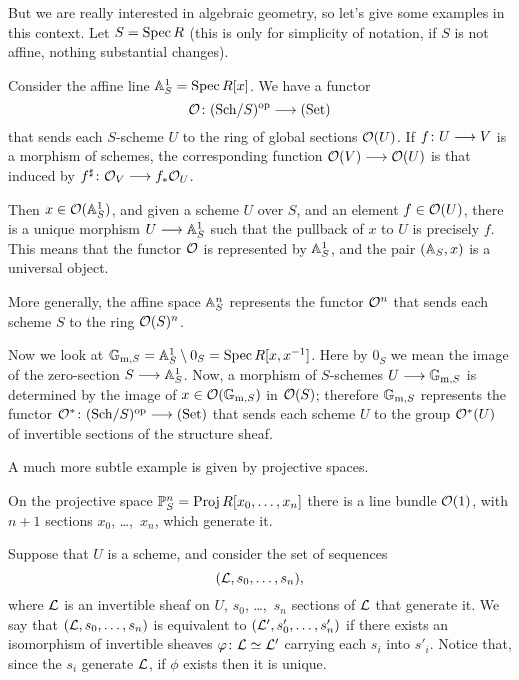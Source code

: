 \begin{2   CONTRAVARIANT FUNCTORS}
\begin{2.1 Yoneda Lemma}
\begin{enumeratei}
\end{enumeratei}

But we are really interested in algebraic geometry, so let's give some examples in this context. Let $S = \spec R$ (this is only for simplicity of notation, if $S$ is not affine, nothing substantial changes).

\begin{example}\label{ex:affinespace} Consider the affine line $\AA^1_S = \spec R[x]$. We have a functor
   \[
   \cO\colon \catsch{S}\op \arr \catset
   \]
that sends each $S$-scheme $U$ to the ring of global sections $\cO(U)$. If $f\colon U \arr V$ is a morphism of schemes, the corresponding function $\cO(V) \arr \cO(U)$ is that induced by $f^{\sharp}\colon \cO_{V} \arr f_{*}\cO_{U}$.

Then $x \in \cO(\AA^1_S)$, and given a scheme $U$ over $S$, and an element $f \in \cO(U)$, there is a unique morphism $U \arr \AA^1_S$ such that the pullback of $x$ to $U$ is precisely $f$. This means that the functor $\cO$ is represented by $\AA^1_S$, and the pair $(\AA_S, x)$ is a universal object.

More generally, the affine space $\AA^n_S$ represents the functor $\cO^n$ that sends each scheme $S$ to the ring $\cO(S)^n$.
\end{example}

\begin{example}
Now we look at $\gm = \AA^1_S \setminus 0_{S} = \spec R[x, x^{-1}]$. Here by $0_S$ we mean the image of the zero-section $S \arr \AA^1_S$. Now, a morphism of $S$-schemes $U \arr \gm$ is determined by the image of $x \in \cO(\gm)$ in $\cO(S)$; therefore $\gm$ represents the functor $\cO^*\colon \catsch{S}\op \arr \catset$ that sends each scheme $U$ to the group $\cO^*(U)$ of invertible sections of the structure sheaf.
\end{example}

A much more subtle example is given by projective spaces.

\begin{example}
On the projective space $\PP^n_S = \proj R[x_0, \ldots, x_n]$ there is a line bundle $\cO(1)$, with $n+1$ sections $x_0$, \dots,~$x_n$, which generate it.

Suppose that $U$ is a scheme, and consider the set of sequences
   \[
   (\cL, s_0, \ldots, s_n),
   \]
where $\cL$ is an invertible sheaf on $U$, $s_0$, \dots,~$s_n$ sections of $\cL$ that generate it. We say that $(\cL, s_0, \ldots, s_n)$ is equivalent to $(\cL', s'_0, \ldots, s'_n)$ if there exists an isomorphism of invertible sheaves $\phi\colon \cL \simeq \cL'$ carrying each $s_i$ into $s'_i$. Notice that, since the $s_i$ generate $\cL$, if $\phi$ exists then it is unique.


\end{example}
\end{2.1 Yoneda Lemma}
\end{2   CONTRAVARIANT FUNCTORS}

